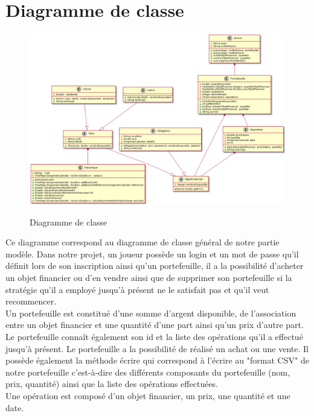 \section{Diagramme de classe}

\begin{figure}[H]
  \center
  \includegraphics[scale=0.35]{../graph/DiagrammeClasseFinalModele.png} \\
  \caption{Diagramme de classe}
\end{figure}

Ce diagramme correspond au diagramme de classe général de notre partie modèle. Dans notre projet, un joueur possède un login et un mot de passe qu'il définit lors de son inscription ainsi qu'un portefeuille, il a la possibilité d'acheter un objet financier ou d'en vendre ainsi que de supprimer son portefeuille si la stratégie qu'il a employé jusqu'à présent ne le satisfait pas et qu'il veut recommencer. \\

\noindent Un portefeuille est constitué d'une somme d'argent disponible, de l’association entre un objet financier et une quantité d'une part ainsi qu'un prix d'autre part. Le portefeuille connaît également son id et la liste des opérations qu'il a effectué jusqu'à présent. Le portefeuille a la possibilité de réalisé un achat ou une vente. Il possède également la méthode écrire qui correspond à l'écrire au "format CSV" de notre portefeuille c'est-à-dire des différents composants du portefeuille (nom, prix, quantité) ainsi que la liste des opérations effectuées. \\

\noindent Une opération est composé d'un objet financier, un prix, une quantité et une date. \\


